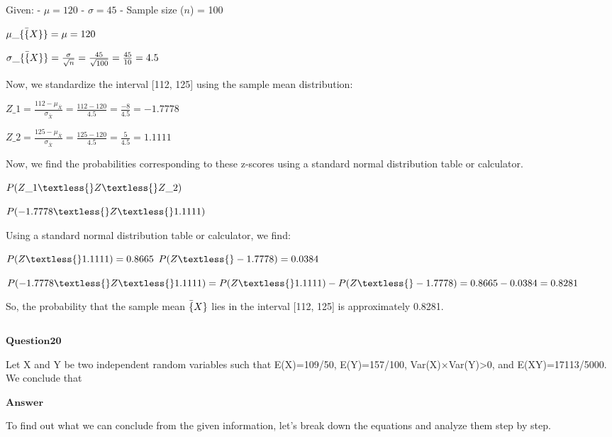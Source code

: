 \documentclass[11pt]{article}
\makeatletter
\newcommand{\boxspacing}{\kern\kvtcb@left@rule\kern\kvtcb@boxsep}
\newcommand{\prompt}[4]{
        {\ttfamily\llap{{\color{#2}[#3]:\hspace{3pt}#4}}\vspace{-\baselineskip}}
    }
\makeatother
\begin{document}
Given: - $ \mu = 120 $ - $ \sigma = 45 $ - Sample size ($ n $) =
100

$ \mu\_\{\bar\{X\}\} = \mu = 120 $

$ \sigma\_\{\bar\{X\}\} = \frac{\sigma}{\sqrt{n}} =
\frac{45}{\sqrt{100}} = \frac{45}{10} = 4.5 $

Now, we standardize the interval {[}112, 125{]} using the sample mean
distribution:

$ Z\_1 = \frac{112 - \mu_{\bar{X}}}{\sigma_{\bar{X}}} =
\frac{112 - 120}{4.5} = \frac{-8}{4.5} = -1.7778 $

$ Z\_2 = \frac{125 - \mu_{\bar{X}}}{\sigma_{\bar{X}}} =
\frac{125 - 120}{4.5} = \frac{5}{4.5} = 1.1111 $

Now, we find the probabilities corresponding to these z-scores using a
standard normal distribution table or calculator.

$ P(Z\_1 \textless{} Z \textless{} Z\_2) $

$ P(-1.7778 \textless{} Z \textless{} 1.1111) $

Using a standard normal distribution table or calculator, we find:

$ P(Z \textless{} 1.1111) = 0.8665 $ $ P(Z \textless{} -1.7778) =
0.0384 $

$ P(-1.7778 \textless{} Z \textless{} 1.1111) = P(Z \textless{} 1.1111)
- P(Z \textless{} -1.7778) = 0.8665 - 0.0384 = 0.8281 $

So, the probability that the sample mean $ \bar\{X\} $ lies in the
interval {[}112, 125{]} is approximately 0.8281.

    \begin{tcolorbox}[breakable, size=fbox, boxrule=1pt, pad at break*=1mm,colback=cellbackground, colframe=cellborder]
\prompt{In}{incolor}{ }{\boxspacing}
\begin{Verbatim}[commandchars=\\\{\}]

\end{Verbatim}
\end{tcolorbox}

    $\textbf{Question20}$

Let X and Y be two independent random variables such that E(X)=109/50,
E(Y)=157/100, Var(X)×Var(Y)\textgreater0, and E(XY)=17113/5000. We
conclude that

$\textbf{Answer}$

    To find out what we can conclude from the given information, let's break
down the equations and analyze them step by step.
\end{document}
